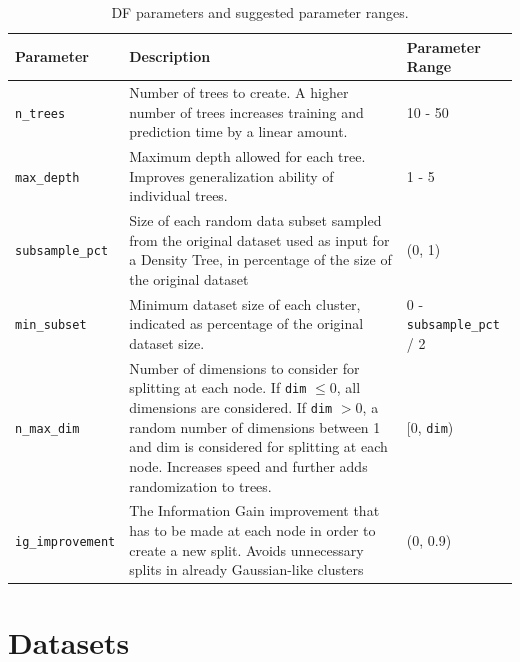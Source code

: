 \documentclass[10pt]{article}
\begin{document}
\begin{table}[H]
    \centering
    \begin{tabular}{p{3cm}p{9cm}p{2.5cm}}
    \toprule
    Parameter & Description & Parameter Range \\ \midrule
    \texttt{n\_trees} & Number of trees to create. A higher number of trees increases training and prediction time by a linear amount. & 10 - 50 \\
    \texttt{max\_depth} & Maximum depth allowed for each tree. Improves generalization ability of individual trees. & 1 - 5 \\
    \texttt{subsample\_pct} & Size of each random data subset sampled from the original dataset used as input for a Density Tree, in percentage of the size of the original dataset &  (0, 1) \\
    \texttt{min\_subset} & Minimum dataset size of each cluster, indicated as percentage of the original dataset size. & 0 - \texttt{subsample\_pct} / 2 \\
    \texttt{n\_max\_dim} & Number of dimensions to consider for splitting at each node. If \texttt{dim} $\leq 0$, all dimensions are considered. If \texttt{dim} $> 0$, a random number of dimensions between 1 and dim is considered for splitting at each node. Increases speed and further adds randomization to trees. & ${[}$0, \texttt{dim}) \\
    \texttt{ig\_improvement} & The Information Gain improvement that has to be made at each node in order to create a new split. Avoids unnecessary splits in already Gaussian-like clusters & (0, 0.9) \\\bottomrule
    \end{tabular}
    \caption{\acrlong{DF} parameters and suggested parameter ranges.}
    \label{table:df-parameters}
\end{table}


\section{Datasets}
\end{document}
